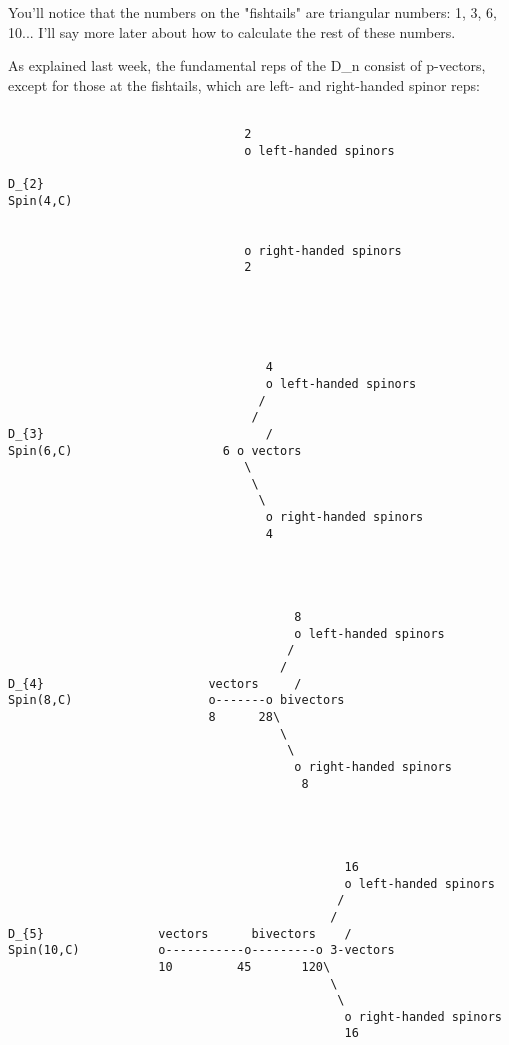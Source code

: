 You'll notice that the numbers on the "fishtails" are triangular
numbers: 1, 3, 6, 10...  I'll say more later about how to calculate
the rest of these numbers.  

As explained last week, the fundamental reps of the D_{n} consist of
p-vectors, except for those at the fishtails, which are left- and
right-handed spinor reps:

                                

\begin{verbatim}

                                 2
                                 o left-handed spinors
                                 
D_{2}                                      
Spin(4,C)                 
                 
                                    
                                 o right-handed spinors
                                 2
                               




                                    4
                                    o left-handed spinors
                                   /
                                  /
D_{3}                               /
Spin(6,C)                     6 o vectors
                                 \
                                  \
                                   \
                                    o right-handed spinors
                                    4




                                        8
                                        o left-handed spinors
                                       /
                                      /
D_{4}                       vectors     /
Spin(8,C)                   o-------o bivectors
                            8      28\
                                      \
                                       \
                                        o right-handed spinors
                                         8




                                               16
                                               o left-handed spinors
                                              /            
                                             / 
D_{5}                vectors      bivectors    /
Spin(10,C)           o-----------o---------o 3-vectors
                     10         45       120\
                                             \
                                              \
                                               o right-handed spinors
                                               16

\end{verbatim}
    
